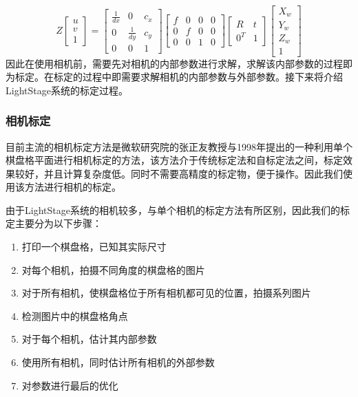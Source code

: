 \begin{equation}
    Z\left[\begin{array}{c}u\\v\\1\end{array}\right] =
    \left[\begin{array}{ccc}\frac{1}{dx}&0&c_x\\0&\frac{1}{dy}&c_y\\0&0&1\end{array}\right]
    \left[\begin{array}{cccc}f&0&0&0\\0&f&0&0\\0&0&1&0\end{array}\right]
    \left[\begin{array}{cc}R&t\\0^T&1\end{array}\right]
    \left[\begin{array}{c}X_w\\Y_w\\Z_w\\1\end{array}\right]
\end{equation}
因此在使用相机前，需要先对相机的内部参数进行求解，求解该内部参数的过程即为标定。在标定的过程中即需要求解相机的内部参数与外部参数。接下来将介绍LightStage系统的标定过程。

\subsubsection{相机标定}

目前主流的相机标定方法是微软研究院的张正友教授与1998年提出的一种利用单个棋盘格平面进行相机标定的方法，该方法介于传统标定法和自标定法之间，标定效果较好，并且计算复杂度低。同时不需要高精度的标定物，便于操作。因此我们使用该方法进行相机的标定。

由于LightStage系统的相机较多，与单个相机的标定方法有所区别，因此我们的标定主要分为以下步骤：
\begin{enumerate}
    \item 打印一个棋盘格，已知其实际尺寸
    \item 对每个相机，拍摄不同角度的棋盘格的图片
    \item 对于所有相机，使棋盘格位于所有相机都可见的位置，拍摄系列图片
    \item 检测图片中的棋盘格角点
    \item 对于每个相机，估计其内部参数
    \item 使用所有相机，同时估计所有相机的外部参数
    \item 对参数进行最后的优化
\end{enumerate}

